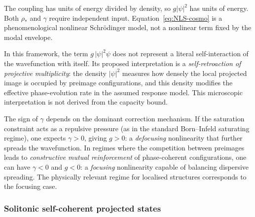     The coupling has units of energy divided by density, so $g|\psi|^2$ has units of energy.
    Both $\rho_*$ and $\gamma$ require independent input.
    Equation~\eqref{eq:NLS-cosmo} is a phenomenological nonlinear Schr\"{o}dinger model, not a nonlinear
    term fixed by the modal envelope.

    \begin{remark}
      \label{rem:cubic-interpretation}
      In this framework, the term $g\,|\psi|^2\psi$ does not represent a literal
      self-interaction of the wavefunction with itself.
      Its proposed interpretation is a \emph{self-retroaction of projective multiplicity}: the density
      $|\psi|^2$ measures how densely the local projected image is occupied by
      preimage configurations, and this density modifies the effective phase-evolution
      rate in the assumed response model.
      This microscopic interpretation is not derived from the capacity bound.
    \end{remark}

    \begin{remark}
      \label{rem:sign-g}
      The sign of $\gamma$ depends on the dominant correction mechanism.
      If the saturation constraint acts as a repulsive pressure (as in the standard
      Born--Infeld saturating regime), one expects $\gamma > 0$, giving $g > 0$: a
      \emph{defocusing} nonlinearity that further spreads the wavefunction.
      In regimes where the competition between preimages leads to \emph{constructive
      mutual reinforcement} of phase-coherent configurations, one can have $\gamma < 0$
      and $g < 0$: a \emph{focusing} nonlinearity capable of balancing dispersive
      spreading.
      The physically relevant regime for localised structures corresponds to the focusing
      case.
    \end{remark}

  \subsubsection*{Solitonic self-coherent projected states}

